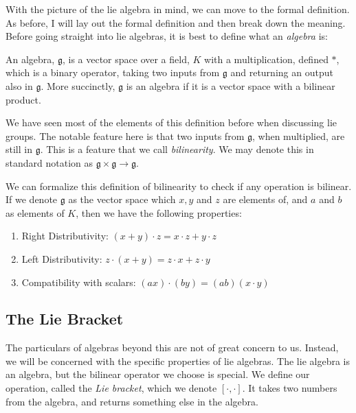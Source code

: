 With the picture of the \gls{lie algebra} in mind, we can move to the formal definition. As before, I will lay out the formal definition and then break down the meaning. Before going straight into \glspl{lie algebra}, it is best to define what an \textit{algebra} is:
\begin{definition}[Algebra]
    An algebra, $\mathfrak{g}$, is a vector space over a field, $K$ with a multiplication, defined $*$, which is a binary operator, taking two inputs from $\mathfrak{g}$ and returning an output also in $\mathfrak{g}$. More succinctly, $\mathfrak{g}$ is an algebra if it is a vector space with a bilinear product.
\end{definition}
We have seen most of the elements of this definition before when discussing \glspl{lie group}. The notable feature here is that two inputs from $\mathfrak{g}$, when multiplied, are still in $\mathfrak{g}$. This is a feature that we call \textit{bilinearity}. We may denote this in standard notation as $\mathfrak{g}\times \mathfrak{g}\rightarrow \mathfrak{g}$.

We can formalize this definition of bilinearity to check if any operation is bilinear. If we denote $\mathfrak{g}$ as the vector space which $x,y$ and $z$ are elements of, and $a$ and $b$ as elements of $K$, then we have the following properties:
\begin{enumerate}
    \item Right Distributivity: $(x+y)\cdot z=x\cdot z+y\cdot z$
    \item Left Distributivity: $z\cdot(x+y)=z\cdot x +z\cdot y$
    \item Compatibility with scalars: $(ax)\cdot(by)=(ab)(x\cdot y)$
\end{enumerate}

\subsection{The Lie Bracket}
The particulars of algebras beyond this are not of great concern to us. Instead, we will be concerned with the specific properties of \glspl{lie algebra}. The \gls{lie algebra} is an algebra, but the bilinear operator we choose is special. We define our operation, called the \textit{Lie bracket}, which we denote $[\cdot,\cdot]$. It takes two numbers from the algebra, and returns something else in the algebra.

